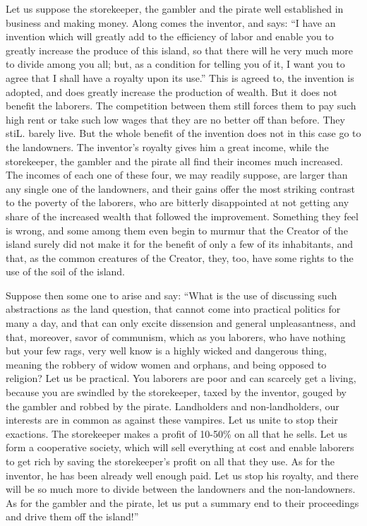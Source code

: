 \documentclass{book}
\begin{document}
Let us suppose the storekeeper, the gambler and the pirate well established in business and making money. Along comes the inventor, and says: “I have an invention which will greatly add to the efficiency of labor and enable you to greatly increase the produce of this island, so that there will he very much more to divide among you all; but, as a condition for telling you of it, I want you to agree that I shall have a royalty upon its use.” This is agreed to, the invention is adopted, and does greatly increase the production of wealth. But it does not benefit the laborers. The competition between them still forces them to pay such high rent or take such low wages that they are no better off than before. They stiL. barely live. But the whole benefit of the invention does not in this case go to the landowners. The inventor’s royalty gives him a great income, while the storekeeper, the gambler and the pirate all find their incomes much increased. The incomes of each one of these four, we may readily suppose, are larger than any single one of the landowners, and their gains offer the most striking contrast to the poverty of the laborers, who are bitterly disappointed at not getting any share of the increased wealth that followed the improvement. Something they feel is wrong, and some among them even begin to murmur that the Creator of the island surely did not make it for the benefit of only a few of its inhabitants, and that, as the common creatures of the Creator, they, too, have some rights to the use of the soil of the island.

Suppose then some one to arise and say: “What is the use of discussing such abstractions as the land question, that cannot come into practical politics for many a day, and that can only excite dissension and general unpleasantness, and that, moreover, savor of communism, which as you laborers, who have nothing but your few rags, very well know is a highly wicked and dangerous thing, meaning the robbery of widow women and orphans, and being opposed to religion? Let us be practical. You laborers are poor and can scarcely get a living, because you are swindled by the storekeeper, taxed by the inventor, gouged by the gambler and robbed by the pirate. Landholders and non-landholders, our interests are in common as against these vampires. Let us unite to stop their exactions. The storekeeper makes a profit of 10-50\% on all that he sells. Let us form a cooperative society, which will sell everything at cost and enable laborers to get rich by saving the storekeeper’s profit on all that they use. As for the inventor, he has been already well enough paid. Let us stop his royalty, and there will be so much more to divide between the landowners and the non-landowners. As for the gambler and the pirate, let us put a summary end to their proceedings and drive them off the island!”
\end{document}

